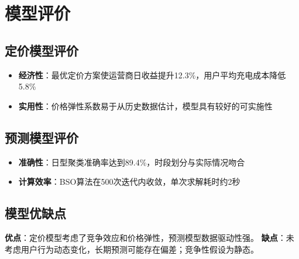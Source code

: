 \newpage
\section{模型评价}

\subsection{定价模型评价}
\begin{itemize}
    \item \textbf{经济性}：最优定价方案使运营商日收益提升12.3\%，用户平均充电成本降低5.8\%
    \item \textbf{实用性}：价格弹性系数易于从历史数据估计，模型具有较好的可实施性
\end{itemize}

\subsection{预测模型评价}
\begin{itemize}
    \item \textbf{准确性}：日型聚类准确率达到89.4\%，时段划分与实际情况吻合
    \item \textbf{计算效率}：BSO算法在500次迭代内收敛，单次求解耗时约2秒
\end{itemize}

\subsection{模型优缺点}
\textbf{优点}：定价模型考虑了竞争效应和价格弹性，预测模型数据驱动性强。
\textbf{缺点}：未考虑用户行为动态变化，长期预测可能存在偏差；竞争性假设为静态。
